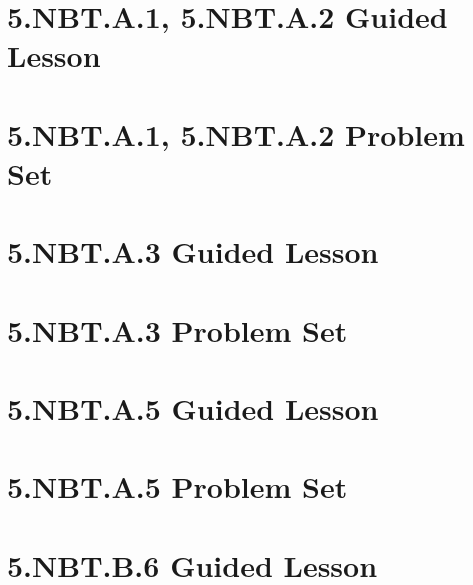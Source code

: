 \documentclass[a4paper,12pt]{article}
\title{}
\date{}
\begin{document}

\tableofcontents
\newpage

\newpage
\section{5.NBT.A.1, 5.NBT.A.2 Guided Lesson}


\newpage
\section{5.NBT.A.1, 5.NBT.A.2 Problem Set}


\newpage
\section{5.NBT.A.3 Guided Lesson}


\newpage
\section{5.NBT.A.3 Problem Set}


\newpage
\section{5.NBT.A.5 Guided Lesson}


\newpage
\section{5.NBT.A.5 Problem Set}


\newpage
\section{5.NBT.B.6 Guided Lesson}

\end{document}
